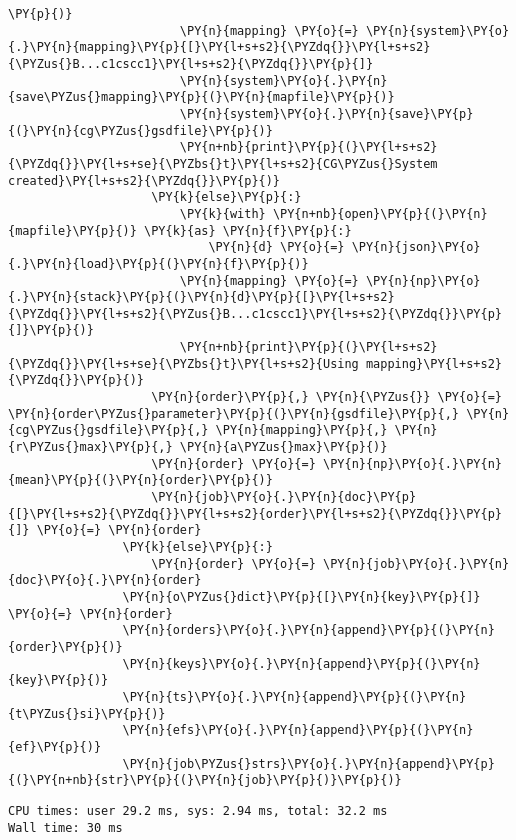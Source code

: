 \begin{tcolorbox}[breakable, size=fbox, boxrule=1pt, pad at break*=1mm,colback=cellbackground, colframe=cellborder]
\begin{Verbatim}[commandchars=\\\{\}]
                        \PY{p}{)}
                        \PY{n}{mapping} \PY{o}{=} \PY{n}{system}\PY{o}{.}\PY{n}{mapping}\PY{p}{[}\PY{l+s+s2}{\PYZdq{}}\PY{l+s+s2}{\PYZus{}B...c1cscc1}\PY{l+s+s2}{\PYZdq{}}\PY{p}{]}
                        \PY{n}{system}\PY{o}{.}\PY{n}{save\PYZus{}mapping}\PY{p}{(}\PY{n}{mapfile}\PY{p}{)}
                        \PY{n}{system}\PY{o}{.}\PY{n}{save}\PY{p}{(}\PY{n}{cg\PYZus{}gsdfile}\PY{p}{)}
                        \PY{n+nb}{print}\PY{p}{(}\PY{l+s+s2}{\PYZdq{}}\PY{l+s+se}{\PYZbs{}t}\PY{l+s+s2}{CG\PYZus{}System created}\PY{l+s+s2}{\PYZdq{}}\PY{p}{)}
                    \PY{k}{else}\PY{p}{:}
                        \PY{k}{with} \PY{n+nb}{open}\PY{p}{(}\PY{n}{mapfile}\PY{p}{)} \PY{k}{as} \PY{n}{f}\PY{p}{:}
                            \PY{n}{d} \PY{o}{=} \PY{n}{json}\PY{o}{.}\PY{n}{load}\PY{p}{(}\PY{n}{f}\PY{p}{)}
                        \PY{n}{mapping} \PY{o}{=} \PY{n}{np}\PY{o}{.}\PY{n}{stack}\PY{p}{(}\PY{n}{d}\PY{p}{[}\PY{l+s+s2}{\PYZdq{}}\PY{l+s+s2}{\PYZus{}B...c1cscc1}\PY{l+s+s2}{\PYZdq{}}\PY{p}{]}\PY{p}{)}
                        \PY{n+nb}{print}\PY{p}{(}\PY{l+s+s2}{\PYZdq{}}\PY{l+s+se}{\PYZbs{}t}\PY{l+s+s2}{Using mapping}\PY{l+s+s2}{\PYZdq{}}\PY{p}{)}
                    \PY{n}{order}\PY{p}{,} \PY{n}{\PYZus{}} \PY{o}{=} \PY{n}{order\PYZus{}parameter}\PY{p}{(}\PY{n}{gsdfile}\PY{p}{,} \PY{n}{cg\PYZus{}gsdfile}\PY{p}{,} \PY{n}{mapping}\PY{p}{,} \PY{n}{r\PYZus{}max}\PY{p}{,} \PY{n}{a\PYZus{}max}\PY{p}{)}
                    \PY{n}{order} \PY{o}{=} \PY{n}{np}\PY{o}{.}\PY{n}{mean}\PY{p}{(}\PY{n}{order}\PY{p}{)}
                    \PY{n}{job}\PY{o}{.}\PY{n}{doc}\PY{p}{[}\PY{l+s+s2}{\PYZdq{}}\PY{l+s+s2}{order}\PY{l+s+s2}{\PYZdq{}}\PY{p}{]} \PY{o}{=} \PY{n}{order}
                \PY{k}{else}\PY{p}{:}
                    \PY{n}{order} \PY{o}{=} \PY{n}{job}\PY{o}{.}\PY{n}{doc}\PY{o}{.}\PY{n}{order}
                \PY{n}{o\PYZus{}dict}\PY{p}{[}\PY{n}{key}\PY{p}{]} \PY{o}{=} \PY{n}{order}
                \PY{n}{orders}\PY{o}{.}\PY{n}{append}\PY{p}{(}\PY{n}{order}\PY{p}{)}
                \PY{n}{keys}\PY{o}{.}\PY{n}{append}\PY{p}{(}\PY{n}{key}\PY{p}{)}
                \PY{n}{ts}\PY{o}{.}\PY{n}{append}\PY{p}{(}\PY{n}{t\PYZus{}si}\PY{p}{)}
                \PY{n}{efs}\PY{o}{.}\PY{n}{append}\PY{p}{(}\PY{n}{ef}\PY{p}{)}
                \PY{n}{job\PYZus{}strs}\PY{o}{.}\PY{n}{append}\PY{p}{(}\PY{n+nb}{str}\PY{p}{(}\PY{n}{job}\PY{p}{)}\PY{p}{)}
\end{Verbatim}
\end{tcolorbox}

    \begin{Verbatim}[commandchars=\\\{\}]
CPU times: user 29.2 ms, sys: 2.94 ms, total: 32.2 ms
Wall time: 30 ms
    \end{Verbatim}

